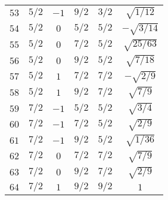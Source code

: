 \begin{table}
\begin{center}
\begin{tabular}{|c|c|c|c|c|c|}
$53$ & $5/2$ & $-1$ & $9/2$ & $3/2$ & $\sqrt{1/12}$ \\ 
$54$ & $5/2$ & $0$ & $5/2$ & $5/2$ & $-\sqrt{3/14}$ \\ 
$55$ & $5/2$ & $0$ & $7/2$ & $5/2$ & $\sqrt{25/63}$ \\ 
$56$ & $5/2$ & $0$ & $9/2$ & $5/2$ & $\sqrt{7/18}$ \\ 
$57$ & $5/2$ & $1$ & $7/2$ & $7/2$ & $-\sqrt{2/9}$ \\ 
$58$ & $5/2$ & $1$ & $9/2$ & $7/2$ & $\sqrt{7/9}$ \\ 
$59$ & $7/2$ & $-1$ & $5/2$ & $5/2$ & $\sqrt{3/4}$ \\ 
$60$ & $7/2$ & $-1$ & $7/2$ & $5/2$ & $\sqrt{2/9}$ \\ 
$61$ & $7/2$ & $-1$ & $9/2$ & $5/2$ & $\sqrt{1/36}$ \\ 
$62$ & $7/2$ & $0$ & $7/2$ & $7/2$ & $\sqrt{7/9}$ \\ 
$63$ & $7/2$ & $0$ & $9/2$ & $7/2$ & $\sqrt{2/9}$ \\ 
$64$ & $7/2$ & $1$ & $9/2$ & $9/2$ & $1$ \\ 
\hline 
\end{tabular}
\end{center}
\end{table}

